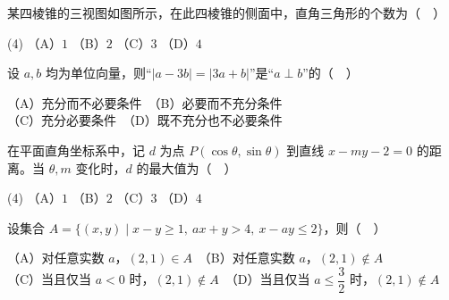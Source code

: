 \begin{question}
某四棱锥的三视图如图所示，在此四棱锥的侧面中，直角三角形的个数为（　）
\nopagebreak[4]
\begin{center}\end{center}
\nopagebreak[4]
\begin{gkopts}(4)
\task （A）$1$
\task （B）$2$
\task （C）$3$
\task （D）$4$
\end{gkopts}

\end{question}
\begin{question}
设 $a,b$ 均为单位向量，则“$|a-3b|=|3a+b|$”是“$a\perp b$”的（　）

（A）充分而不必要条件　（B）必要而不充分条件\\
（C）充分必要条件　（D）既不充分也不必要条件

\end{question}
\begin{question}
在平面直角坐标系中，记 $d$ 为点 $P(\cos\theta,\sin\theta)$ 到直线 $x-my-2=0$ 的距离。当 $\theta,m$ 变化时，$d$ 的最大值为（　）

\begin{gkopts}(4)
\task （A）$1$
\task （B）$2$
\task （C）$3$
\task （D）$4$
\end{gkopts}

\end{question}
\begin{question}
设集合 $A=\{(x,y)\mid x-y\geqslant1,\ ax+y>4,\ x-ay\leqslant2\}$，则（　）

（A）对任意实数 $a$，$(2,1)\in A$　（B）对任意实数 $a$，$(2,1)\notin A$\\
（C）当且仅当 $a<0$ 时，$(2,1)\notin A$　（D）当且仅当 $a\leqslant\dfrac32$ 时，$(2,1)\notin A$

\end{question}

